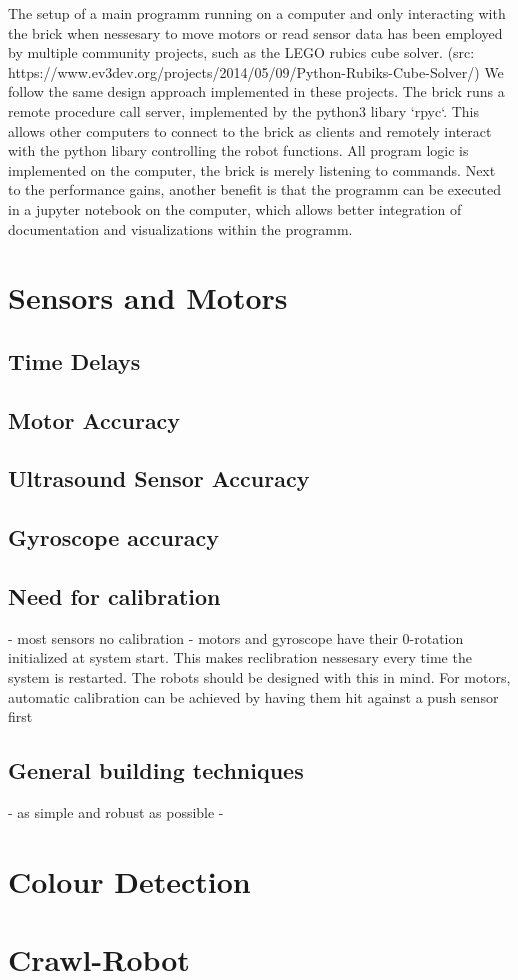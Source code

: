\documentclass[11pt, a4paper]{article}
\begin{document}
The setup of a main programm running on a computer and only interacting with the brick when nessesary to move motors or read sensor data has been employed by multiple community projects, such as the LEGO rubics cube solver. (src: https://www.ev3dev.org/projects/2014/05/09/Python-Rubiks-Cube-Solver/) We follow the same design approach implemented in these projects. The brick runs a remote procedure call server, implemented by the python3 libary `rpyc`. This allows other computers to connect to the brick as clients and remotely interact with the python libary controlling the robot functions. All program logic is implemented on the computer, the brick is merely listening to commands. Next to the performance gains, another benefit is that the programm can be executed in a jupyter notebook on the computer, which allows better integration of documentation and visualizations within the programm.

\section{Sensors and Motors}

\subsection{Time Delays}


\subsection{Motor Accuracy}


\subsection{Ultrasound Sensor Accuracy}

\subsection{Gyroscope accuracy}


\subsection{Need for calibration}
- most sensors no calibration
- motors and gyroscope have their 0-rotation initialized at system start. This makes reclibration nessesary every time the system is restarted. The robots should be designed with this in mind. For motors, automatic calibration can be achieved by having them hit against a push sensor first

\subsection{General building techniques}
- as simple and robust as possible
- 


\section{Colour Detection}

\section{Crawl-Robot}
\end{document}

